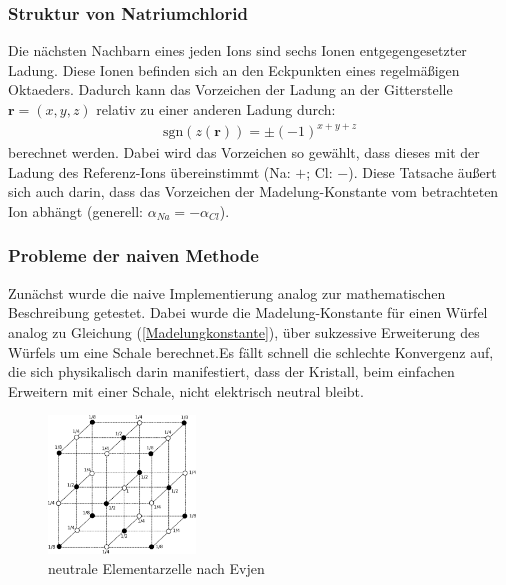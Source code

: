 \documentclass[10pt,a4paper]{article}
\begin{document}
\subsubsection{Struktur von Natriumchlorid}

Die nächsten Nachbarn eines jeden Ions sind sechs Ionen entgegengesetzter
Ladung. Diese Ionen befinden sich an den Eckpunkten eines regelmäßigen
Oktaeders. Dadurch kann das Vorzeichen der Ladung an der Gitterstelle
$\mathbf{r} = \left( x,y,z \right)$ relativ zu einer anderen Ladung durch:
\begin{align}
\mathrm{sgn}\left(z(\mathbf{r})\right) = \pm \left( -1 \right)^{x+y+z}
\label{eq:vorzeichen}
\end{align}
berechnet werden. Dabei wird das Vorzeichen so gewählt, dass dieses mit der Ladung
des Referenz-Ions übereinstimmt (Na: $+$; Cl: $-$). Diese Tatsache
äußert sich auch darin, dass das Vorzeichen der Madelung-Konstante vom
betrachteten Ion abhängt (generell: $\alpha_{Na} = - \alpha_{Cl}$).


\subsubsection{Probleme der naiven Methode}

Zunächst wurde die naive Implementierung analog zur mathematischen Beschreibung
getestet. Dabei wurde die Madelung-Konstante für einen Würfel analog zu
Gleichung (\ref{Madelungkonstante}), über sukzessive Erweiterung des Würfels um eine
Schale berechnet.Es fällt schnell die schlechte Konvergenz auf, die sich
physikalisch darin manifestiert, dass der Kristall, beim einfachen Erweitern
mit einer Schale, nicht elektrisch neutral bleibt.

\begin{figure}
	\vspace{-10pt}
	\centering
	\includegraphics[width=0.35\textwidth]{./figures/wuerfel.eps}
	\caption{neutrale Elementarzelle nach Evjen}
	\label{skalierungsgrafik3d}
	\vspace{-20pt}
\end{figure}
\end{document}

